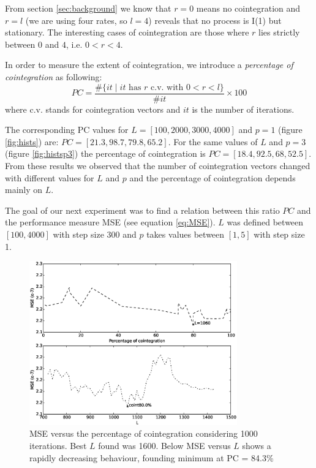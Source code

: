 From section \ref{sec:background} we know that $r=0$ means no cointegration and $r=l$ (we are using four rates, so $l=4$) reveals that no process is I(1) but stationary.
The interesting cases of cointegration are those where $r$ lies strictly
between $0$ and $4$, i.e. $0<r<4$.

In order to measure the extent of cointegration, we introduce a
{\em percentage of cointegration\/} as following:
\begin{equation} \label{eq:pcoint}
PC = 
\frac{\#\{ it \mid \text{$it$ has $r$ c.v. with $0<r<l$}\}}
     {\#it}\times 100
\end{equation}
where c.v. stands for cointegration vectors and $it$ is the number of iterations.
 
The corresponding PC values for $L = [100, 2000, 3000, 4000]$ and $p=1$ (figure  \ref{fig:hists}) are: $PC = [21.3, 98.7, 79.8,  65.2]$. For the same values of $L$ and $p=3$ (figure  \ref{fig:histsp3}) the percentage of cointegration is $PC = [18.4, 92.5, 68,  52.5]$. From these results we observed that the number of cointegration vectors changed with different values for $L$ and $p$ and the percentage of cointegration depends mainly on $L$. 


The goal of our next experiment was to find a relation between this ratio
$PC$ and the performance measure MSE (see equation 
\ref{eq:MSE}). $L$ was defined between $[100,4000]$ with step size 300 and $p$ takes values between $[1,5]$ with step size 1.  

\begin{figure}[ht!]
  \centering
  \includegraphics[width=0.8\textwidth]{img/MSE-offset20520-p-1-freq-10s}
  \caption{MSE versus the percentage of cointegration considering 1000
  iterations. Best $L$ found was 1600. Below MSE versus $L$ shows a rapidly decreasing behaviour, founding minimum at PC = 84.3\% }
  \label{fig:cointvsmse}
\end{figure}

